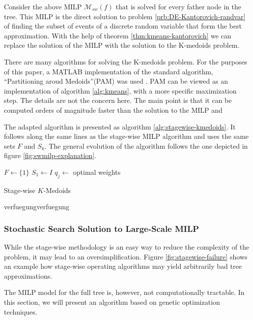 Consider the above MILP $\mathcal{M}_{sw}(f)$ that is solved for every father node in the tree.
This MILP is the direct solution to problem \ref{prb:DE-Kantorovich-randvar} of finding the subset of events of a discrete random variable that form the best approximation.
With the help of theorem \ref{thm:kmeans-kantorovich} we can replace the solution of the MILP with the solution to the K-medoids problem.

There are many algorithms for solving the K-medoids problem.
For the purposes of this paper, a MATLAB implementation of the standard algorithm, ``Partitioning aroud Medoids''(PAM) was used \cite{Kaufman1987}.
PAM can be viewed as an implementation of algorithm \ref{alg:kmeans}, with a more specific maximization step. The details are not the concern here. The main point is that it can be computed orders of magnitude faster than the solution to the MILP and 

The adapted algorithm is presented as algorithm \ref{alg:stagewise-kmedoids}.
It follows along the same lines as the stage-wise MILP algorithm and uses the same sets $F$ and $S_k$.
The general evolution of the algorithm follows the one depicted in figure \ref{fig:swmilp-explanation}.
\begin{algorithm}
  $F \leftarrow \{1\}$
  $S_1 \leftarrow I$
  $q_j\leftarrow $ optimal weights 
  \caption{Stage-wise $K$-Medoids}
  \label{alg:stagewise-kmedoids}
verfuegungverfuegung\end{algorithm}
\subsubsection{Stochastic Search Solution to Large-Scale MILP}
While the stage-wise methodology is an easy way to reduce the complexity of the problem, it may lead to an oversimplification. Figure \ref{fig:stagewise-failure} shows an example how stage-wise operating algorithms may yield arbitrarily bad tree approximations. 

The MILP model for the full tree is, however, not computationally tractable.
In this section, we will present an algorithm based on genetic optimization techniques. 

